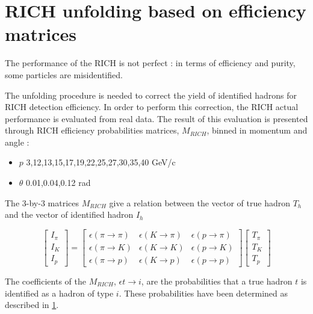 
\section{RICH unfolding based on efficiency matrices}

The performance of the RICH is not perfect : in terms of efficiency and purity, some particles
are misidentified.

The unfolding procedure is needed to correct the yield of identified hadrons for RICH detection efficiency.
In order to perform this correction, the RICH actual performance is evaluated from real data. The result of
this evaluation is presented through RICH efficiency probabilities matrices, $M_{RICH}$, binned in momentum
and angle :

\begin{itemize}
  \item $p$ {3,12,13,15,17,19,22,25,27,30,35,40} GeV/c
  \item $\theta$ {0.01,0.04,0.12} rad
\end{itemize}

The 3-by-3 matrices $M_{RICH}$ give a relation between the vector of true hadron $T_h$ and the vector of
identified hadron $I_h$

\begin{equation}
\begin{bmatrix}
I_{\pi} \\
I_K \\
I_p
\end{bmatrix}
=
\begin{bmatrix}
\epsilon(\pi \rightarrow \pi) & \epsilon(K \rightarrow \pi) & \epsilon(p \rightarrow \pi)\\
\epsilon(\pi \rightarrow K) & \epsilon(K \rightarrow K) & \epsilon(p \rightarrow K) \\
\epsilon(\pi \rightarrow p) & \epsilon(K \rightarrow p) & \epsilon(p \rightarrow p)
\end{bmatrix}
\begin{bmatrix}
T_{\pi} \\
T_K \\
T_p
\end{bmatrix}
\end{equation}

The coefficients of the $M_{RICH}$, $\epsilon{t \rightarrow i}$, are the probabilities that a true hadron
$t$ is identified as a hadron of type $i$. These probabilities have been determined as described in \ref{}.

